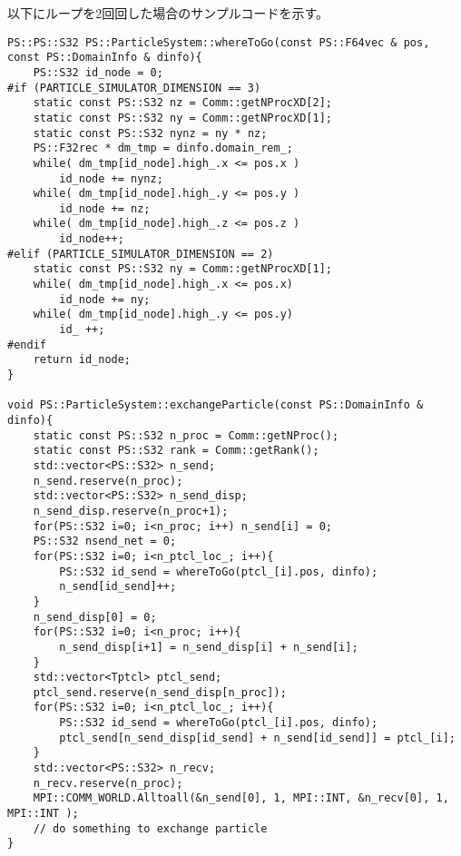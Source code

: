 以下にループを2回回した場合のサンプルコードを示す。
\begin{lstlisting}[caption=粒子交換]
PS::PS::S32 PS::ParticleSystem::whereToGo(const PS::F64vec & pos, const PS::DomainInfo & dinfo){
    PS::S32 id_node = 0;
#if (PARTICLE_SIMULATOR_DIMENSION == 3)
    static const PS::S32 nz = Comm::getNProcXD[2];
    static const PS::S32 ny = Comm::getNProcXD[1];
    static const PS::S32 nynz = ny * nz;
    PS::F32rec * dm_tmp = dinfo.domain_rem_;
    while( dm_tmp[id_node].high_.x <= pos.x ) 
        id_node += nynz;
    while( dm_tmp[id_node].high_.y <= pos.y )
        id_node += nz;
    while( dm_tmp[id_node].high_.z <= pos.z )
        id_node++;
#elif (PARTICLE_SIMULATOR_DIMENSION == 2)
    static const PS::S32 ny = Comm::getNProcXD[1];
    while( dm_tmp[id_node].high_.x <= pos.x)
        id_node += ny;
    while( dm_tmp[id_node].high_.y <= pos.y)
        id_ ++;
#endif
    return id_node;
}

void PS::ParticleSystem::exchangeParticle(const PS::DomainInfo & dinfo){
    static const PS::S32 n_proc = Comm::getNProc();
    static const PS::S32 rank = Comm::getRank();
    std::vector<PS::S32> n_send;
    n_send.reserve(n_proc);
    std::vector<PS::S32> n_send_disp;
    n_send_disp.reserve(n_proc+1);
    for(PS::S32 i=0; i<n_proc; i++) n_send[i] = 0;
    PS::S32 nsend_net = 0;
    for(PS::S32 i=0; i<n_ptcl_loc_; i++){
        PS::S32 id_send = whereToGo(ptcl_[i].pos, dinfo);
        n_send[id_send]++;
    }
    n_send_disp[0] = 0;
    for(PS::S32 i=0; i<n_proc; i++){
        n_send_disp[i+1] = n_send_disp[i] + n_send[i];
    }
    std::vector<Tptcl> ptcl_send;
    ptcl_send.reserve(n_send_disp[n_proc]);
    for(PS::S32 i=0; i<n_ptcl_loc_; i++){
        PS::S32 id_send = whereToGo(ptcl_[i].pos, dinfo);
        ptcl_send[n_send_disp[id_send] + n_send[id_send]] = ptcl_[i];
    }
    std::vector<PS::S32> n_recv;
    n_recv.reserve(n_proc);
    MPI::COMM_WORLD.Alltoall(&n_send[0], 1, MPI::INT, &n_recv[0], 1, MPI::INT );
    // do something to exchange particle
}
\end{lstlisting}

